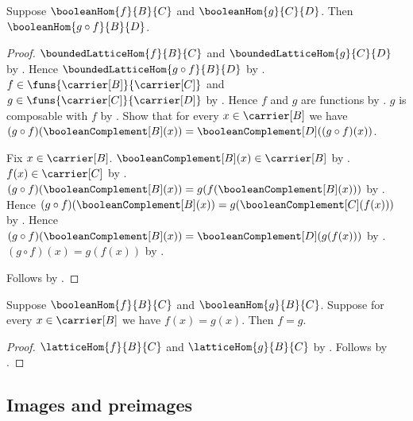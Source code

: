 \begin{theorem}\label{boolean_hom_composition}
    Suppose $\booleanHom{f}{B}{C}$ and
        $\booleanHom{g}{C}{D}$.
    Then $\booleanHom{g\circ f}{B}{D}$.
\end{theorem}
\begin{proof}
    $\boundedLatticeHom{f}{B}{C}$ and
        $\boundedLatticeHom{g}{C}{D}$ by
        .
    Hence $\boundedLatticeHom{g\circ f}{B}{D}$ by
        .
    $f\in\funs{\carrier[B]}{\carrier[C]}$ and
        $g\in\funs{\carrier[C]}{\carrier[D]}$ by
        .
    Hence $f$ and $g$ are functions by .
    $g$ is composable with $f$ by .
    Show that for every $x\in\carrier[B]$ we have
        $(g\circ f)(\booleanComplement[B](x))
            =\booleanComplement[D]((g\circ f)(x))$.
    \begin{subproof}
        Fix $x\in\carrier[B]$.
        $\booleanComplement[B](x)\in\carrier[B]$ by
            .
        $f(x)\in\carrier[C]$ by .
        $(g\circ f)(\booleanComplement[B](x))
            =g(f(\booleanComplement[B](x)))$ by
            .
        Hence $(g\circ f)(\booleanComplement[B](x))
            =g(\booleanComplement[C](f(x)))$ by
            .
        Hence $(g\circ f)(\booleanComplement[B](x))
            =\booleanComplement[D](g(f(x)))$ by
            .
        $(g\circ f)(x)=g(f(x))$ by .
    \end{subproof}
    Follows by .
\end{proof}

\begin{theorem}\label{boolean_hom_extensionality}
    Suppose $\booleanHom{f}{B}{C}$ and
        $\booleanHom{g}{B}{C}$.
    Suppose for every $x\in\carrier[B]$ we have $f(x)=g(x)$.
    Then $f=g$.
\end{theorem}
\begin{proof}
    $\latticeHom{f}{B}{C}$ and $\latticeHom{g}{B}{C}$ by
        .
    Follows by .
\end{proof}

\subsection{Images and preimages}

